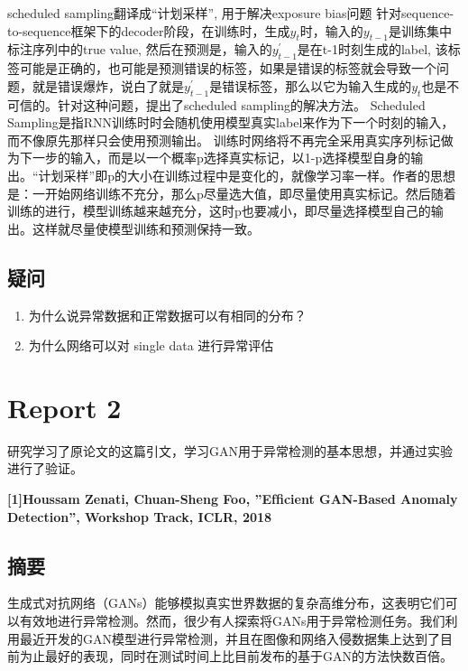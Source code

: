 \documentclass[12pt]{article}
\begin{document}
scheduled sampling翻译成``计划采样'', 用于解决exposure bias问题
针对sequence-to-sequence框架下的decoder阶段，在训练时，生成\(y_{t}\)时，输入的\(y_{t-1}\)是训练集中标注序列中的true
value, 然后在预测是，输入的\(y_{t-1}^{\prime}\)是在t-1时刻生成的label,
该标签可能是正确的，也可能是预测错误的标签，如果是错误的标签就会导致一个问题，就是错误爆炸，说白了就是\(y_{t-1}^{\prime}\)是错误标签，那么以它为输入生成的\(y_{t}\)也是不可信的。针对这种问题，提出了scheduled
sampling的解决方法。 Scheduled
Sampling是指RNN训练时时会随机使用模型真实label来作为下一个时刻的输入，而不像原先那样只会使用预测输出。
训练时网络将不再完全采用真实序列标记做为下一步的输入，而是以一个概率p选择真实标记，以1-p选择模型自身的输出。``计划采样''即p的大小在训练过程中是变化的，就像学习率一样。作者的思想是：一开始网络训练不充分，那么p尽量选大值，即尽量使用真实标记。然后随着训练的进行，模型训练越来越充分，这时p也要减小，即尽量选择模型自己的输出。这样就尽量使模型训练和预测保持一致。

\subsection{\textbf{疑问}}

\begin{enumerate}
\def\labelenumi{\arabic{enumi}.}
\item
  为什么说异常数据和正常数据可以有相同的分布？
\item
  为什么网络可以对 single data 进行异常评估
\end{enumerate}

\newpage

\section{Report 2}

研究学习了原论文的这篇引文，学习GAN用于异常检测的基本思想，并通过实验进行了验证。

\textbf{{[}1{]}Houssam Zenati, Chuan-Sheng Foo, ''Efﬁcient GAN-Based
Anomaly Detection'', Workshop Track, ICLR, 2018}

\subsection{\textbf{摘要}}

生成式对抗网络（GANs）能够模拟真实世界数据的复杂高维分布，这表明它们可以有效地进行异常检测。然而，很少有人探索将GANs用于异常检测任务。我们利用最近开发的GAN模型进行异常检测，并且在图像和网络入侵数据集上达到了目前为止最好的表现，同时在测试时间上比目前发布的基于GAN的方法快数百倍。
\end{document}
